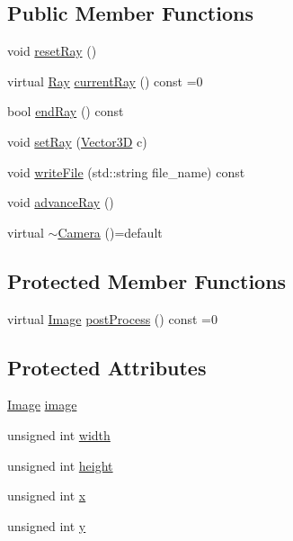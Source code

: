 \subsection*{Public Member Functions}
\begin{DoxyCompactItemize}
\item 
void \hyperlink{classCamera_ae43adf47442c44dcf773a62b9260fb1c}{reset\+Ray} ()
\item 
virtual \hyperlink{classRay}{Ray} \hyperlink{classCamera_a73f9e795bc8d667e7e6fce64608fb3cc}{current\+Ray} () const =0
\item 
bool \hyperlink{classCamera_ab27a7042ad7cc371dd4868d0280b4ba1}{end\+Ray} () const 
\item 
void \hyperlink{classCamera_a1277ae7e1fd3449359f30b6f70b7f5ce}{set\+Ray} (\hyperlink{classVector3D}{Vector3D} c)
\item 
void \hyperlink{classCamera_a0e17a78add185ff298e233acd3a8eca5}{write\+File} (std\+::string file\+\_\+name) const 
\item 
void \hyperlink{classCamera_abffca24621bfc5b57fdecf6b28fe1444}{advance\+Ray} ()
\item 
virtual \hyperlink{classCamera_ad3ed0c5e02c46f73ba92673598e40514}{$\sim$\+Camera} ()=default
\end{DoxyCompactItemize}
\subsection*{Protected Member Functions}
\begin{DoxyCompactItemize}
\item 
virtual \hyperlink{Background_8h_a10624870db6b3fba52ad9c5d430308e1}{Image} \hyperlink{classCamera_a2bba2307abf8fe4614badcf6706286dd}{post\+Process} () const =0
\end{DoxyCompactItemize}
\subsection*{Protected Attributes}
\begin{DoxyCompactItemize}
\item 
\hyperlink{Background_8h_a10624870db6b3fba52ad9c5d430308e1}{Image} \hyperlink{classCamera_a0f3ba7059e4c02622c6d98515e8d9df1}{image}
\item 
unsigned int \hyperlink{classCamera_aa18f0bf8b6e8cb661643d980a4484ac0}{width}
\item 
unsigned int \hyperlink{classCamera_ae9ed166dbbc8876027ecbec9af8761c4}{height}
\item 
unsigned int \hyperlink{classCamera_afd0591953df24bec6c110a1a9fc26de7}{x}
\item 
unsigned int \hyperlink{classCamera_a532d3a4ec10ede7538b5aaba8ffaf2d9}{y}
\end{DoxyCompactItemize}


